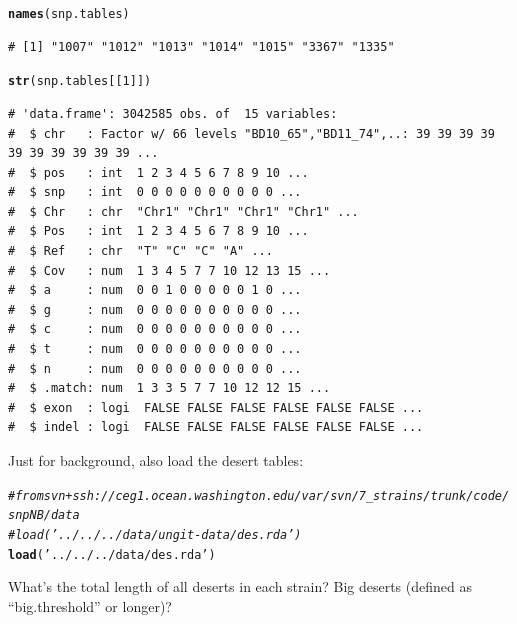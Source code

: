 \documentclass{article}\usepackage[]{graphicx}\usepackage[]{color}
\makeatletter
\newcommand{\hlnum}[1]{\textcolor[rgb]{0.686,0.059,0.569}{#1}}%
\newcommand{\hlstr}[1]{\textcolor[rgb]{0.192,0.494,0.8}{#1}}%
\newcommand{\hlcom}[1]{\textcolor[rgb]{0.678,0.584,0.686}{\textit{#1}}}%
\newcommand{\hlstd}[1]{\textcolor[rgb]{0.345,0.345,0.345}{#1}}%
\newcommand{\hlkwd}[1]{\textcolor[rgb]{0.737,0.353,0.396}{\textbf{#1}}}%
\newenvironment{kframe}{%
 \def\at@end@of@kframe{}%
 \ifinner\ifhmode%
  \def\at@end@of@kframe{\end{minipage}}%
  \begin{minipage}{\columnwidth}%
 \fi\fi%
 \def\FrameCommand##1{\hskip\@totalleftmargin \hskip-\fboxsep
 \colorbox{shadecolor}{##1}\hskip-\fboxsep
     \hskip-\linewidth \hskip-\@totalleftmargin \hskip\columnwidth}%
 \MakeFramed {\advance\hsize-\width
   \@totalleftmargin\z@ \linewidth\hsize
   \@setminipage}}%
 {\par\unskip\endMakeFramed%
 \at@end@of@kframe}
\newenvironment{knitrout}{}{} %
\makeatother
\begin{document}
\begin{knitrout}\footnotesize
{}\color{fgcolor}\begin{kframe}
\begin{alltt}
\hlkwd{names}\hlstd{(snp.tables)}
\end{alltt}
\begin{verbatim}
# [1] "1007" "1012" "1013" "1014" "1015" "3367" "1335"
\end{verbatim}
\begin{alltt}
\hlkwd{str}\hlstd{(snp.tables[[}\hlnum{1}\hlstd{]])}
\end{alltt}
\begin{verbatim}
# 'data.frame':	3042585 obs. of  15 variables:
#  $ chr   : Factor w/ 66 levels "BD10_65","BD11_74",..: 39 39 39 39 39 39 39 39 39 39 ...
#  $ pos   : int  1 2 3 4 5 6 7 8 9 10 ...
#  $ snp   : int  0 0 0 0 0 0 0 0 0 0 ...
#  $ Chr   : chr  "Chr1" "Chr1" "Chr1" "Chr1" ...
#  $ Pos   : int  1 2 3 4 5 6 7 8 9 10 ...
#  $ Ref   : chr  "T" "C" "C" "A" ...
#  $ Cov   : num  1 3 4 5 7 7 10 12 13 15 ...
#  $ a     : num  0 0 1 0 0 0 0 0 1 0 ...
#  $ g     : num  0 0 0 0 0 0 0 0 0 0 ...
#  $ c     : num  0 0 0 0 0 0 0 0 0 0 ...
#  $ t     : num  0 0 0 0 0 0 0 0 0 0 ...
#  $ n     : num  0 0 0 0 0 0 0 0 0 0 ...
#  $ .match: num  1 3 3 5 7 7 10 12 12 15 ...
#  $ exon  : logi  FALSE FALSE FALSE FALSE FALSE FALSE ...
#  $ indel : logi  FALSE FALSE FALSE FALSE FALSE FALSE ...
\end{verbatim}
\end{kframe}
\end{knitrout}

Just for background, also load the desert tables:

\begin{knitrout}\footnotesize
{}\color{fgcolor}\begin{kframe}
\begin{alltt}
\hlcom{# from svn+ssh://ceg1.ocean.washington.edu/var/svn/7_strains/trunk/code/snpNB/data}
\hlcom{#load('../../../data/ungit-data/des.rda')}
\hlkwd{load}\hlstd{(}\hlstr{'../../../data/des.rda'}\hlstd{)}
\end{alltt}
\end{kframe}
\end{knitrout}

What's the total length of all deserts in each strain?  Big deserts (defined as ``big.threshold'' or longer)?
\end{document}

